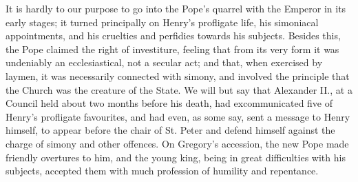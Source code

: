 It is hardly to our purpose to go into the Pope's
quarrel with the Emperor in its early stages; it turned principally on
Henry's profligate life, his simoniacal appointments, and his
cruelties and perfidies towards his subjects. Besides this, the Pope
claimed the right of investiture, feeling that from its very form it
was undeniably an ecclesiastical, not a secular act; and that, when
exercised by laymen, it was necessarily connected with simony, and
involved the principle that the Church was the creature of the State.
We will but say that Alexander II., at a Council held about two months
before his death, had excommunicated five of Henry's profligate
favourites, and had even, as some say, sent a message to Henry
himself, to appear before the chair of St. Peter and defend himself
against the charge of simony and other offences. On Gregory's
accession, the new Pope made friendly overtures to him, and the young
king, being in great difficulties with his subjects, accepted them
with much profession of humility and repentance.

